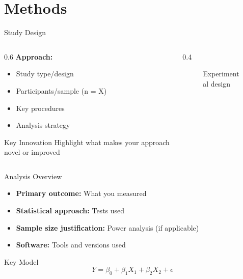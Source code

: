 \documentclass[aspectratio=169,11pt]{beamer}
\begin{document}

\section{Methods}

\begin{frame}{Study Design}
  \begin{columns}[T]
    
    \begin{column}{0.6\textwidth}
      \textbf{Approach:}
      \begin{itemize}
        \item Study type/design
        \item Participants/sample (n = X)
        \item Key procedures
        \item Analysis strategy
      \end{itemize}
      
      \vspace{0.5cm}
      
      \begin{alertblock}{Key Innovation}
        Highlight what makes your approach novel or improved
      \end{alertblock}
    \end{column}
    
    \begin{column}{0.4\textwidth}
      \begin{figure}
        \centering
        \caption{Experimental design}
      \end{figure}
    \end{column}
    
  \end{columns}
\end{frame}

\begin{frame}{Analysis Overview}
  \begin{itemize}
    \item \textbf{Primary outcome:} What you measured
    \item \textbf{Statistical approach:} Tests used
    \item \textbf{Sample size justification:} Power analysis (if applicable)
    \item \textbf{Software:} Tools and versions used
  \end{itemize}
  
  \vspace{0.5cm}
  
  \begin{exampleblock}{Key Model}
    \begin{equation}
      Y = \beta_0 + \beta_1 X_1 + \beta_2 X_2 + \epsilon
    \end{equation}
  \end{exampleblock}
\end{frame}
\end{document}
